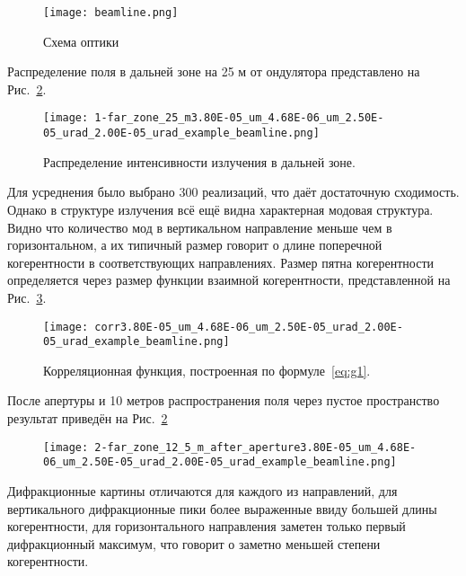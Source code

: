 \begin{figure}[H] 
	\centering 	\texttt{[image: beamline.png]}
	\caption{Схема оптики}
	\label{fig:beamline}
\end{figure}
Распределение поля в дальней зоне на 25 м от ондулятора представлено на Рис.~\ref{fig:focusing_system_far_zone}.
\begin{figure}[H] 
	\centering 	\texttt{[image: 1-far\_zone\_25\_m3.80E-05\_um\_4.68E-06\_um\_2.50E-05\_urad\_2.00E-05\_urad\_example\_beamline.png]}
	\caption{Распределение интенсивности излучения в дальней зоне. }
	\label{fig:focusing_system_far_zone}
\end{figure}
Для усреднения было выбрано 300 реализаций, что даёт достаточную сходимость. Однако в структуре излучения всё ещё видна характерная модовая структура. Видно что количество мод в вертикальном направление меньше чем в горизонтальном, а их типичный размер говорит о длине поперечной когерентности в соответствующих направлениях. Размер пятна когерентности определяется через размер функции взаимной когерентности, представленной на Рис.~\ref{fig:focusing_system_corr}.
\begin{figure}[H] 
	\centering 	\texttt{[image: corr3.80E-05\_um\_4.68E-06\_um\_2.50E-05\_urad\_2.00E-05\_urad\_example\_beamline.png]}
	\caption{Корреляционная функция, построенная по формуле~\ref{eq:g1}. }
	\label{fig:focusing_system_corr}
\end{figure}
\noindent После апертуры и 10 метров распространения поля через пустое пространство результат приведён на Рис.~\ref{fig:focusing_system_far_zone}
\begin{figure}[H] 
	\centering 	\texttt{[image: 2-far\_zone\_12\_5\_m\_after\_aperture3.80E-05\_um\_4.68E-06\_um\_2.50E-05\_urad\_2.00E-05\_urad\_example\_beamline.png]}
	\caption{}
	\label{fig:focusing_system_after_aperture}
\end{figure}
\noindent Дифракционные картины отличаются для каждого из направлений, для вертикального дифракционные пики более выраженные ввиду большей длины когерентности, для горизонтального направления заметен только первый дифракционный максимум, что говорит о заметно меньшей степени когерентности.

